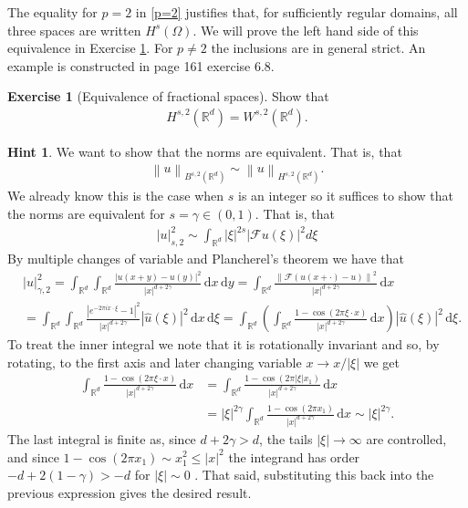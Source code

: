 \documentclass[
    a4paper,
    DIV=14,
    abstract=true,
    numbers=noenddot
]
{scrartcl}
\theoremstyle{definition}
\newtheorem{exercise}{Exercise}
\newtheorem*{hint}{Hint}
\newcommand{\wh}[1]{\widehat{#1}}
\renewcommand{\norm}[1]{\left\lVert #1 \right\rVert}\renewcommand{\abs}[1]{\left| #1 \right|}
\renewcommand{\d}{\,\mathrm{d}}\newcommand{\dx}{\,\mathrm{d}x}
\newcommand{\R}{\mathbb{R}}
\newcommand{\Ff}{\mathcal{F}}
\begin{document}
The equality for $p=2$ in \eqref{p=2} justifies that, for sufficiently regular domains, all three spaces are written $H^s(\Omega )$.   We will prove the left hand side of this equivalence in Exercise \ref{equivalence of fractional spaces}. For $p\neq 2$ the inclusions are in general strict. An example is constructed in \cite{stein1970singular} page 161 exercise 6.8.
\begin{exercise}[Equivalence of fractional spaces]\label{equivalence of fractional spaces}
  Show that
  \begin{align*}
    H^{s,2}(\R^d)=W^{s,2}(\R^d).
  \end{align*}
\end{exercise}
\begin{hint}
  We want to show that the norms are equivalent. That is, that
  \begin{align*}
    \norm{u}_{B^{s,2}(\R^d)}\sim \norm{u}_{H^{s,2}(\R^d)}.
  \end{align*}
  We already know this is the case when $s$ is an integer so it suffices to show that the norms are equivalent for $s= \gamma  \in (0,1)$. That is, that
  \begin{align*}
    |u|_{s,2}^2\sim \int_{\mathbb{R}^d}|\xi|^{2 s}|\mathcal{F} u(\xi)|^2 d \xi
  \end{align*}
  By multiple changes of variable and Plancherel's theorem we have that
  \begin{align*}
     & |u|_{\gamma ,2}^2  =\int_{\R^d}\int_{\R^d}\frac{\abs{u(x+y)-u(y)}^2}{\abs{x}^{d+2\gamma	}}\d x \d y                                                                                                       = \int_{\R^d}\frac{\norm{\Ff (u(x+\cdot )-u)}^2}{\abs{x}^{d+2\gamma	}}\d x \\
     & =\int_{\R^d}\int_{\R^d}  \frac{|e^{-2 \pi i x \cdot \xi}-1|^2}{\abs{x}^{d+2\gamma	}}|\wh{u}(\xi)|^2\d x\d\xi =\int_{\R^d}\left(\int_{\R^d}  \frac{1-\cos(2\pi \xi\cdot x)}{\abs{x}^{d+2\gamma	}}\d x\right)|\wh{u}(\xi)|^2\d\xi.
  \end{align*}
  To treat the inner integral we note that it is rotationally invariant and so, by rotating, to the first axis and later changing variable $x \to x / \abs{\xi}$ we get
  \begin{align*}
    \int_{\R^d}  \frac{1-\cos(2\pi \xi\cdot x)}{\abs{x}^{d+2\gamma	}}\d x & =\int_{\R^d}  \frac{1-\cos(2\pi \abs{\xi}x_1 )}{\abs{x}^{d+2\gamma	}}\d x                                          \\
                                                                          & =\abs{\xi}^{2 \gamma } \int_{\R^d}  \frac{1-\cos(2\pi  x_1) }{\abs{x}^{d+2\gamma	}}\d x\sim \abs{\xi}^{2 \gamma }.
  \end{align*}
  The last integral is finite as, since $d+2\gamma >d$, the tails $\abs{\xi}\to\infty$ are controlled, and since $1-\cos(2\pi x_1)\sim x_1^2\leq \abs{x}^2$ the integrand has order $-d+2(1-\gamma)>-d$ for $\abs{\xi}\sim 0$ . That said, substituting this back into the previous expression gives the desired result.
\end{hint}
\end{document}
